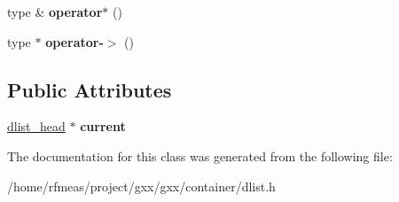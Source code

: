 \begin{DoxyCompactItemize}
\item 
type \& {\bfseries operator$\ast$} ()\hypertarget{classgxx_1_1dlist_1_1iterator_adf86acd3eb1422a717f920ba6a725b6f}{}\label{classgxx_1_1dlist_1_1iterator_adf86acd3eb1422a717f920ba6a725b6f}

\item 
type $\ast$ {\bfseries operator-\/$>$} ()\hypertarget{classgxx_1_1dlist_1_1iterator_aabb6c6357c6d9d6dae453e70922b4232}{}\label{classgxx_1_1dlist_1_1iterator_aabb6c6357c6d9d6dae453e70922b4232}

\end{DoxyCompactItemize}
\subsection*{Public Attributes}
\begin{DoxyCompactItemize}
\item 
\hyperlink{structdlist__head}{dlist\+\_\+head} $\ast$ {\bfseries current}\hypertarget{classgxx_1_1dlist_1_1iterator_abe8f97e8387c1c2bea5dd176ba6779b7}{}\label{classgxx_1_1dlist_1_1iterator_abe8f97e8387c1c2bea5dd176ba6779b7}

\end{DoxyCompactItemize}


The documentation for this class was generated from the following file\+:\begin{DoxyCompactItemize}
\item 
/home/rfmeas/project/gxx/gxx/container/dlist.\+h\end{DoxyCompactItemize}
